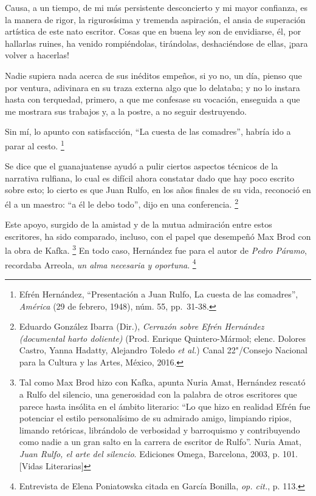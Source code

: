 \documentclass[14pt,twoside,final]{extbook} %
\let\oldfootnote\footnote
\renewcommand\footnote[1]{%
\oldfootnote{\hspace{1mm}#1}}
\begin{document}
\begin{quoting}
Causa, a un tiempo, de mi más persistente desconcierto y mi mayor confianza, es la manera de rigor, la rigurosísima y tremenda aspiración, el ansia de superación artística de este nato escritor. Cosas que en buena ley son de envidiarse, él, por hallarlas ruines, ha venido rompiéndolas, tirándolas, deshaciéndose de ellas, ¡para volver a hacerlas!

Nadie supiera nada acerca de sus inéditos empeños, si yo no, un día, pienso que por ventura, adivinara en su traza externa algo que lo delataba; y no lo instara hasta con terquedad, primero, a que me confesase su vocación, enseguida a que me mostrara sus trabajos y, a la postre, a no seguir destruyendo.

Sin mí, lo apunto con satisfacción, ``La cuesta de las comadres'', habría ido a parar al cesto.\footnote{Efrén Hernández, ``Presentación a Juan Rulfo, \textquotesingle\textquotesingle{}La cuesta de las comadres\textquotesingle\textquotesingle{}'', \emph{América} (29 de febrero, 1948), núm. 55, \mbox{pp. 31-38.}}
\end{quoting}
Se dice que el guanajuatense ayudó a pulir ciertos aspectos técnicos de la narrativa rulfiana, lo cual es difícil ahora constatar dado que hay poco escrito sobre esto; lo cierto es que Juan Rulfo, en los años finales de su vida, reconoció en él a un maestro: ``a él le debo todo'', dijo en una conferencia.\footnote{Eduardo González Ibarra (Dir.), \emph{Cerrazón sobre Efrén Hernández (documental harto doliente)} (Prod. Enrique Quintero-Mármol; elenc. Dolores Castro, Yanna Hadatty, Alejandro Toledo \emph{et al.}) Canal 22"/Consejo Nacional para la Cultura y las Artes, México, 2016.}

Este apoyo, surgido de la amistad y de la mutua admiración entre estos escritores, ha sido comparado, incluso, con el papel que desempeñó Max Brod con la obra de Kafka.\footnote{Tal como Max Brod hizo con Kafka, apunta Nuria Amat, Hernández rescató a Rulfo del silencio, una generosidad con la palabra de otros escritores que parece hasta insólita en el ámbito literario: ``Lo que hizo en realidad Efrén fue potenciar el estilo personalísimo de su admirado amigo, limpiando ripios, limando retóricas, librándolo de verbosidad y barroquismo y contribuyendo como nadie a un gran salto en la carrera de escritor de Rulfo''. Nuria Amat, \emph{Juan Rulfo, el arte del silencio}. Ediciones Omega, Barcelona, 2003, p. 101. [Vidas Literarias]} En todo caso, Hernández fue para el autor de \emph{Pedro Páramo}, recordaba Arreola, \emph{un alma necesaria y oportuna}.\footnote{Entrevista de Elena Poniatowska citada en García Bonilla, \emph{op. cit.}, p. 113.}
\end{document}

